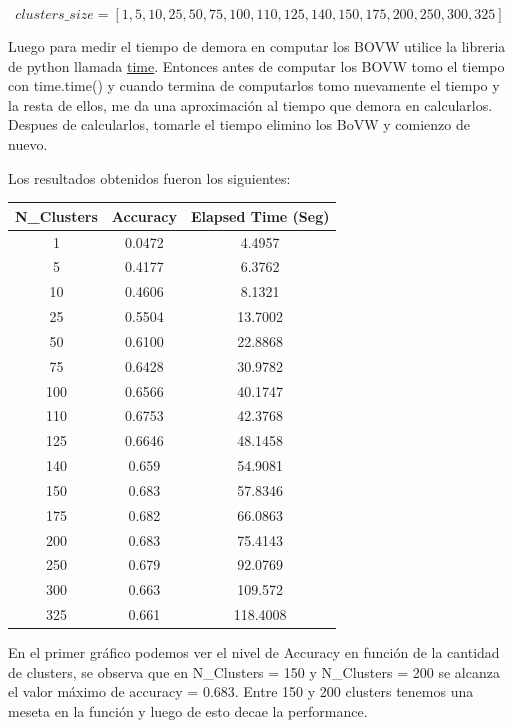 \documentclass[11pt, spanish, a4paper]{article}
\begin{document}
$$clusters\_size = [1,5,10,25,50,75,100,110,125,140,150,175,200,250,300,325]$$

Luego para medir el tiempo de demora en computar los BOVW utilice la libreria de python llamada \href{https://docs.python.org/3.5/library/time.html}{time}. Entonces antes de computar los BOVW tomo el tiempo con time.time() y cuando termina de computarlos tomo nuevamente el tiempo y la resta de ellos, me da una aproximación al tiempo que demora en calcularlos. Despues de calcularlos, tomarle el tiempo elimino los BoVW y comienzo de nuevo.

Los resultados obtenidos fueron los siguientes:

\begin{center}
    \begin{tabular}{ | c | c | c |}
    \hline
    \textbf{N\_Clusters} & \textbf{Accuracy} & \textbf{Elapsed Time (Seg)}\\ \hline
    1 & 0.0472 & 4.4957    \\ \hline
    5 & 0.4177 & 6.3762 \\ \hline
    10 & 0.4606 & 8.1321 \\ \hline
    25 & 0.5504 & 13.7002 \\ \hline
    50 & 0.6100 & 22.8868 \\ \hline
    75 & 0.6428 & 30.9782 \\ \hline
    100 & 0.6566 & 40.1747 \\ \hline
    110 & 0.6753 & 42.3768 \\ \hline
    125 & 0.6646 & 48.1458 \\ \hline
    140 & 0.659 & 54.9081 \\ \hline
    150 & 0.683 & 57.8346 \\ \hline
    175 & 0.682 & 66.0863 \\ \hline
    200 & 0.683 & 75.4143 \\ \hline
    250 & 0.679 & 92.0769 \\ \hline
    300 & 0.663 & 109.572 \\ \hline
    325 & 0.661 & 118.4008 \\ \hline
    \end{tabular}
\end{center}


En el primer gráfico podemos ver el nivel de Accuracy en función de la cantidad de clusters, se observa que en N\_Clusters = 150 y N\_Clusters = 200 se alcanza el valor máximo de accuracy = 0.683. Entre 150 y 200 clusters tenemos una meseta en la función y luego de esto decae la performance.\\
\end{document}
